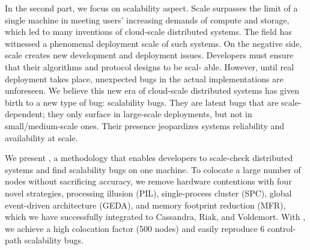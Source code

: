 In the second part, we focus on scalability aspect. Scale surpasses the limit of
a single machine in meeting users' increasing demands of compute and storage,
which led to many inventions of cloud-scale distributed systems. The field has
witnessed a phenomenal deployment scale of such systems. On the negative side,
scale creates new development and deployment issues. Developers must ensure that
their algorithms and protocol designs to be scal- able. However, until real
deployment takes place, unexpected bugs in the actual implementations are
unforeseen. We believe this new era of cloud-scale distributed systems has given
birth to a new type of bug: scalability bugs. They are latent bugs that are
scale-dependent; they only surface in large-scale deployments, but not in
small/medium-scale ones. Their presence jeopardizes systems reliability and
availability at scale.

We present \sck, a methodology that enables developers to scale-check
distributed systems and find scalability bugs on one machine. To colocate a
large number of  nodes without sacrificing accuracy, we remove hardware
contentions with four novel strategies, processing illusion (PIL),
single-process cluster (SPC), global event-driven architecture (GEDA), and
memory footprint reduction (MFR), which we have successfully integrated to
Cassandra, Riak, and Voldemort. With \sck, we achieve a high colocation factor
(500 nodes) and easily reproduce 6 control-path scalability bugs.
